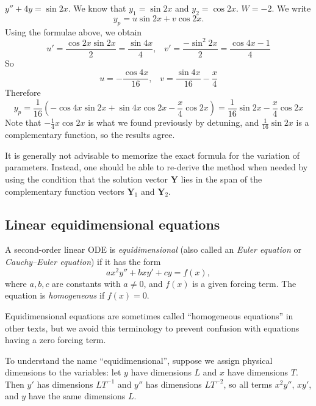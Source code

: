 \documentclass[a4paper]{article}
\begin{document}
\begin{eg}
  $y'' + 4y = \sin 2x$. We know that $y_1 = \sin 2x$ and $y_2 = \cos 2x$. $W = -2$. We write
  \[
    y_p = u\sin 2x + v\cos 2x.
  \]
  Using the formulae above, we obtain
  \[
    u' = \frac{\cos 2x\sin 2x}{2} = \frac{\sin 4x}{4},\;\;\; v' = \frac{-\sin^2 2x}{2} = \frac{\cos 4x - 1}{4}
  \]
  So
  \[
    u = -\frac{\cos 4x}{16}, \;\;\; v = \frac{\sin 4x}{16} - \frac{x}{4}
  \]
  Therefore
  \[
    y_p = \frac{1}{16}(-\cos 4x\sin 2x + \sin 4x\cos 2x - \frac{x}{4}\cos 2x) = \frac{1}{16}\sin 2x - \frac{x}{4}\cos 2x
  \]
  Note that $-\frac{1}{4}x\cos 2x$ is what we found previously by detuning, and $\frac{1}{16}\sin 2x$ is a complementary function, so the results agree.
\end{eg}

\begin{remark}
  It is generally not advisable to memorize the exact formula for the variation of parameters. Instead, one should be able to re-derive the method when needed by using the condition that the solution vector $\mathbf{Y}$ lies in the span of the complementary function vectors $\mathbf{Y}_1$ and $\mathbf{Y}_2$.
\end{remark}

\subsection{Linear equidimensional equations}
\begin{defi}
  A second-order linear ODE is \emph{equidimensional} (also called an \emph{Euler equation} or \emph{Cauchy--Euler equation}) if it has the form
  \[
    ax^2y'' + bxy' + cy = f(x),
  \]
  where $a, b, c$ are constants with $a \neq 0$, and $f(x)$ is a given forcing term. The equation is \emph{homogeneous} if $f(x) = 0$.
\end{defi}

\begin{remark}[Terminology]
  Equidimensional equations are sometimes called ``homogeneous equations'' in other texts, but we avoid this terminology to prevent confusion with equations having a zero forcing term.
\end{remark}

\begin{remark}
  To understand the name ``equidimensional'', suppose we assign physical dimensions to the variables: let $y$ have dimensions $L$ and $x$ have dimensions $T$. Then $y'$ has dimensions $LT^{-1}$ and $y''$ has dimensions $LT^{-2}$, so all terms $x^2 y''$, $xy'$, and $y$ have the same dimensions $L$.
\end{remark}
\end{document}
